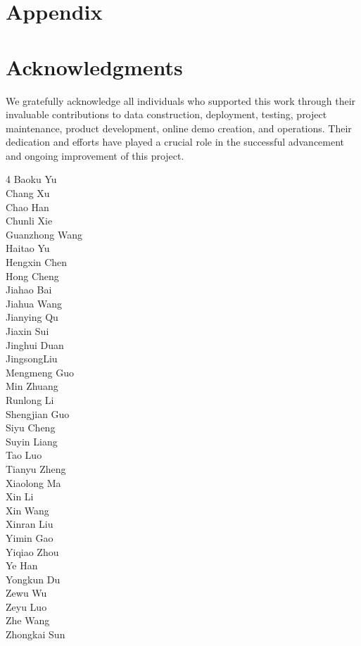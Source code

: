 \documentclass[11pt, a4paper, logo, copyright, nonumbering]{paddleocr}
\begin{document}


\newpage
\appendix

\section*{Appendix}
\label{sec:appendix}

\section{Acknowledgments}
We gratefully acknowledge all individuals who supported this work through their invaluable contributions to data construction, deployment, testing, project maintenance, product development, online demo creation, and operations. Their dedication and efforts have played a crucial role in the successful advancement and ongoing improvement of this project.

\setlength{\parskip}{0pt} %
\setlength{\itemsep}{0pt} %
\setlength{\parsep}{0pt}  %
\setlength{\parindent}{0pt} %
\begin{multicols}{4}
Baoku Yu\\
Chang Xu\\
Chao Han\\
Chunli Xie\\
Guanzhong Wang\\
Haitao Yu\\
Hengxin Chen\\
Hong Cheng\\
Jiahao Bai\\
Jiahua Wang\\
Jianying Qu\\
Jiaxin Sui\\
Jinghui Duan\\
JingsongLiu \\
Mengmeng Guo\\
Min Zhuang\\
Runlong Li\\
Shengjian Guo\\
Siyu Cheng\\
Suyin Liang\\
Tao Luo \\
Tianyu Zheng\\
Xiaolong Ma\\
Xin Li\\
Xin Wang \\
Xinran Liu\\
Yimin Gao\\
Yiqiao Zhou\\
Ye Han\\
Yongkun Du \\
Zewu Wu\\
Zeyu Luo\\
Zhe Wang\\
Zhongkai Sun\\

\end{multicols}
\end{document}
